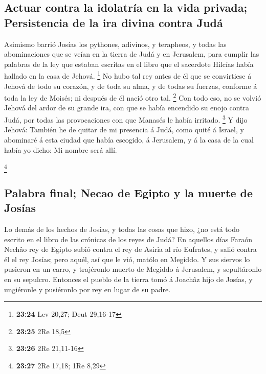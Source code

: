 \hypertarget{actuar-contra-la-idolatruxeda-en-la-vida-privada-persistencia-de-la-ira-divina-contra-juduxe1}{%
\subsection{Actuar contra la idolatría en la vida privada; Persistencia
de la ira divina contra
Judá}\label{actuar-contra-la-idolatruxeda-en-la-vida-privada-persistencia-de-la-ira-divina-contra-juduxe1}}

 Asimismo barrió Josías los pythones, adivinos, y
terapheos, y todas las abominaciones que se veían en la tierra de Judá y
en Jerusalem, para cumplir las palabras de la ley que estaban escritas
en el libro que el sacerdote Hilcías había hallado en la casa de Jehová.
\footnote{\textbf{23:24} Lev 20,27; Deut 29,16-17}  No hubo
tal rey antes de él que se convirtiese á Jehová de todo su corazón, y de
toda su alma, y de todas su fuerzas, conforme á toda la ley de Moisés;
ni después de él nació otro tal. \footnote{\textbf{23:25} 2Re 18,5}
 Con todo eso, no se volvió Jehová del ardor de su grande
ira, con que se había encendido su enojo contra Judá, por todas las
provocaciones con que Manasés le había irritado. \footnote{\textbf{23:26}
  2Re 21,11-16}  Y dijo Jehová: También he de quitar de mi
presencia á Judá, como quité á Israel, y abominaré á esta ciudad que
había escogido, á Jerusalem, y á la casa de la cual había yo dicho: Mi
nombre será allí.

\footnote{\textbf{23:27} 2Re 17,18; 1Re 8,29}

\hypertarget{palabra-final-necao-de-egipto-y-la-muerte-de-josuxedas}{%
\subsection{Palabra final; Necao de Egipto y la muerte de
Josías}\label{palabra-final-necao-de-egipto-y-la-muerte-de-josuxedas}}

 Lo demás de los hechos de Josías, y todas las cosas que
hizo, ¿no está todo escrito en el libro de las crónicas de los reyes de
Judá?  En aquellos días Faraón Nechâo rey de Egipto subió
contra el rey de Asiria al río Eufrates, y salió contra él el rey
Josías; pero aquél, así que le vió, matólo en Megiddo.  Y
sus siervos lo pusieron en un carro, y trajéronlo muerto de Megiddo á
Jerusalem, y sepultáronlo en su sepulcro. Entonces el pueblo de la
tierra tomó á Joachâz hijo de Josías, y ungiéronle y pusiéronlo por rey
en lugar de su padre.

